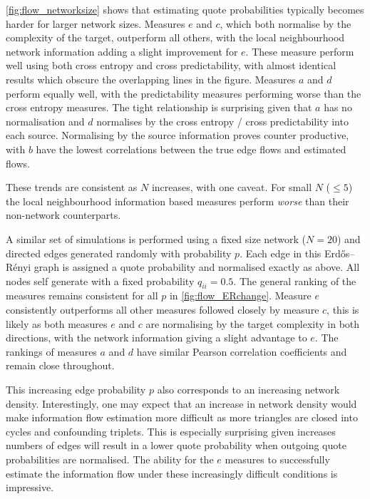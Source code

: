 \autoref{fig:flow_networksize} shows that estimating quote probabilities typically becomes harder for larger network sizes. %
Measures $e$ and $c$, which both normalise by the complexity of the target, outperform all others, with the local neighbourhood network information adding a slight improvement for $e$. These measure perform well using both cross entropy and cross predictability, with almost identical results which obscure the overlapping lines in the figure. Measures $a$ and $d$ perform equally well, with the predictability measures performing worse than the cross entropy measures. The tight relationship is surprising given that $a$ has no normalisation and $d$ normalises by the cross entropy / cross predictability into each source. Normalising by the source information proves counter productive, with $b$ have the lowest correlations between the true edge flows and estimated flows.

These trends are consistent as $N$ increases, with one caveat. For small $N$ ($\leq 5$) the local neighbourhood information based measures perform \emph{worse} than their non-network counterparts. %

A similar set of simulations is performed using a fixed size network ($N=20$) and directed edges generated randomly with probability $p$. Each edge in this Erdős–Rényi graph is assigned a quote probability and normalised exactly as above. All nodes self generate with a fixed probability $q_{ii}=0.5$. The general ranking of the measures remains consistent for all $p$ in \autoref{fig:flow_ERchange}. Measure $e$ consistently outperforms all other measures followed closely by measure $c$, this is likely as both measures $e$ and $c$ are normalising by the target complexity in both directions, with the network information giving a slight advantage to $e$. The rankings of measures $a$ and $d$ have similar Pearson correlation coefficients and remain close throughout. 

This increasing edge probability $p$ also corresponds to an increasing network density. Interestingly, one may expect that an increase in network density would make information flow estimation more difficult as more triangles are closed into cycles and confounding triplets. This is especially surprising given increases numbers of edges will result in a lower quote probability when outgoing quote probabilities are normalised. The ability for the $e$ measures to successfully estimate the information flow under these increasingly difficult conditions is impressive. 

